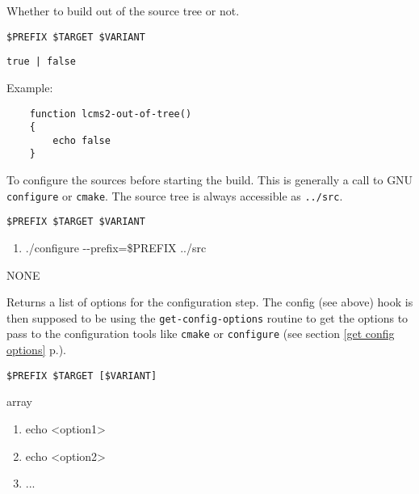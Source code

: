 \documentclass[a4paper,12pt,twoside]{article}
\newcommand{\code}[1]{\texttt{#1}}
\newcommand{\seeref}[1]{see section \ref{#1} p.\pageref{#1}}
\newcommand{\ddash}{-{}-}
\begin{document}
\begin{description}[font=\large\texttt]
	\item[<module>-out-of-tree] Whether to build out of the source tree or not.
	\begin{description}[font=\textit,style=standard]
		\item[parameter] \tabto{2cm} \code{\$PREFIX \$TARGET \$VARIANT}
		\item[return] \tabto{2cm} \code{true | false}
	\end{description}

	Example:
	\begin{lstlisting}
	function lcms2-out-of-tree()
	{
		echo false
	}
	\end{lstlisting}

	\item[<module>-config] To configure the sources before starting the build. This is generally a call to GNU \code{configure} or \code{cmake}. The source tree is always accessible as \code{../src}.
	\begin{description}[font=\textit,style=standard]
		\item[parameter] \tabto{2cm} \code{\$PREFIX \$TARGET \$VARIANT}
		\begin{enumerate}
			\item ./configure \ddash{}prefix=\$PREFIX ../src
		\end{enumerate}
		\item[return] \tabto{2cm} NONE
	\end{description}

	\item[<module>-{[}common|<variant>{]}-config-options] Returns a list of options for the configuration step. The config (see above) hook is then supposed to be using the \code{get-config-options} routine to get the options to pass to the configuration tools like \code{cmake} or \code{configure} (\seeref{get config options}).
	\begin{description}[font=\textit,style=standard]
		\item[parameter] \tabto{2cm} \code{\$PREFIX \$TARGET [\$VARIANT]}
		\item[return] \tabto{2cm} array
		\begin{enumerate}
			\item echo <option1>
			\item echo <option2>
			\item ...
		\end{enumerate}
	\end{description}


\end{description}
\end{document}
